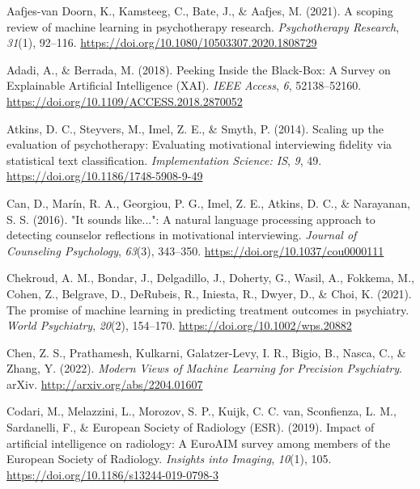 \documentclass[
  man]{apa7}
\newlength{\cslhangindent}
\newlength{\cslentryspacingunit} %
\newenvironment{CSLReferences}[2] %
 {%
  \setlength{\parindent}{0pt}
  \ifodd #1
  \let\oldpar\par
  \def\par{\hangindent=\cslhangindent\oldpar}
  \fi
  \setlength{\parskip}{#2\cslentryspacingunit}
 }%
 {}
\begin{document}
\hypertarget{refs}{}
\begin{CSLReferences}{1}{0}
\leavevmode{}%
Aafjes-van Doorn, K., Kamsteeg, C., Bate, J., \& Aafjes, M. (2021). A scoping review of machine learning in psychotherapy research. \emph{Psychotherapy Research}, \emph{31}(1), 92--116. \url{https://doi.org/10.1080/10503307.2020.1808729}

\leavevmode{}%
Adadi, A., \& Berrada, M. (2018). Peeking {Inside} the {Black}-{Box}: {A} {Survey} on {Explainable} {Artificial} {Intelligence} ({XAI}). \emph{IEEE Access}, \emph{6}, 52138--52160. \url{https://doi.org/10.1109/ACCESS.2018.2870052}

\leavevmode{}%
Atkins, D. C., Steyvers, M., Imel, Z. E., \& Smyth, P. (2014). Scaling up the evaluation of psychotherapy: Evaluating motivational interviewing fidelity via statistical text classification. \emph{Implementation Science: IS}, \emph{9}, 49. \url{https://doi.org/10.1186/1748-5908-9-49}

\leavevmode{}%
Can, D., Marín, R. A., Georgiou, P. G., Imel, Z. E., Atkins, D. C., \& Narayanan, S. S. (2016). "{It} sounds like...": {A} natural language processing approach to detecting counselor reflections in motivational interviewing. \emph{Journal of Counseling Psychology}, \emph{63}(3), 343--350. \url{https://doi.org/10.1037/cou0000111}

\leavevmode{}%
Chekroud, A. M., Bondar, J., Delgadillo, J., Doherty, G., Wasil, A., Fokkema, M., Cohen, Z., Belgrave, D., DeRubeis, R., Iniesta, R., Dwyer, D., \& Choi, K. (2021). The promise of machine learning in predicting treatment outcomes in psychiatry. \emph{World Psychiatry}, \emph{20}(2), 154--170. \url{https://doi.org/10.1002/wps.20882}

\leavevmode{}%
Chen, Z. S., Prathamesh, Kulkarni, Galatzer-Levy, I. R., Bigio, B., Nasca, C., \& Zhang, Y. (2022). \emph{Modern {Views} of {Machine} {Learning} for {Precision} {Psychiatry}}. arXiv. \url{http://arxiv.org/abs/2204.01607}

\leavevmode{}%
Codari, M., Melazzini, L., Morozov, S. P., Kuijk, C. C. van, Sconfienza, L. M., Sardanelli, F., \& European Society of Radiology (ESR). (2019). Impact of artificial intelligence on radiology: A {EuroAIM} survey among members of the {European} {Society} of {Radiology}. \emph{Insights into Imaging}, \emph{10}(1), 105. \url{https://doi.org/10.1186/s13244-019-0798-3}


\end{CSLReferences}
\end{document}
